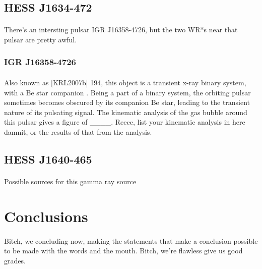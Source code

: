 \documentclass[a4paper, titlepage, oneside]{article}
\begin{document}
\begin{multicols}{2}
\subsection{HESS J1634-472}
\paragraph{}
There's an intersting pulsar IGR J16358-4726, but the two WR*s near that pulsar are pretty awful.

\subsubsection{IGR J16358-4726}
\paragraph{}
Also known as [KRL2007b] 194, this object is a transient x-ray binary system, with a Be star companion \parencite{Falanga:2011}. Being a part of a binary system, the orbiting pulsar sometimes becomes obscured by its companion Be star, leading to the transient nature of its pulsating signal. The kinematic analysis of the gas bubble around this pulsar gives a figure of \_\_\_\_. Reece, list your kinematic analysis in here damnit, or the results of that from the analysis.

\subsection{HESS J1640-465}
\paragraph{}
Possible sources for this gamma ray source

\section{Conclusions}
\paragraph{}
Bitch, we concluding now, making the statements that make a conclusion possible to be made with the words and the mouth. Bitch, we're flawless give us good grades.
\end{multicols}

\printbibliography[heading = bibintoc] %

\newpage
\end{document}
